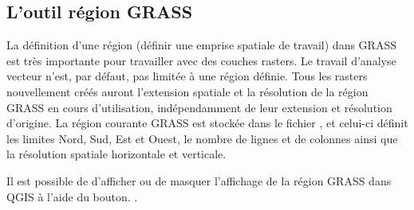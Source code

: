 \subsection{L'outil région GRASS}\label{sec:grass_region}

La définition d'une région (définir une emprise spatiale de travail) dans GRASS est très importante pour travailler avec des couches rasters. Le travail d'analyse vecteur n'est, par défaut, pas limitée à une région définie. Tous les rasters nouvellement créés auront l'extension spatiale et la résolution de la région GRASS en cours d'utilisation, indépendamment de leur extension et résolution d'origine. La région courante GRASS est stockée dans le fichier , et celui-ci définit les limites Nord, Sud, Est et Ouest, le nombre de lignes et de colonnes ainsi que la résolution spatiale horizontale et verticale.

Il est possible de d'afficher ou de masquer l'affichage de la région GRASS dans QGIS à l'aide du bouton. .

